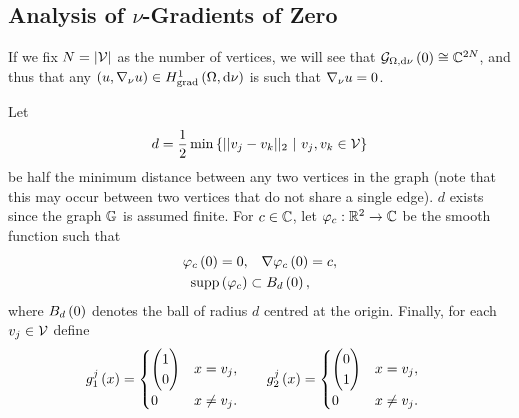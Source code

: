 \subsection{Analysis of $\nu$-Gradients of Zero} \label{appS:VertexGradZero}
If we fix $N = \left\lvert \mathcal{V} \right\rvert$ as the number of vertices, we will see that $\mathcal{G}_{ \Omega, \mathrm{d}\nu}\left( 0 \right) \cong \mathbb{C}^{2N}$, and thus that any $\left( u,\nabla_{\nu}u \right)\in H^1_\mathrm{grad}\left( \Omega, \mathrm{d}\nu \right)$ is such that $\nabla_{\nu}u=0$.
\begin{definition} \label{def:UsefulObjects}
	Let 
	\begin{align*}
		d=\recip{2}\min\clbracs{\norm{v_j-v_k}_2 \ \vert \ v_j,v_k\in\vertSet}
	\end{align*}
	be half the minimum distance between any two vertices in the graph (note that this may occur between two vertices that do not share a single edge).
	$d$ exists since the graph $\mathbb{G}$ is assumed finite.
	For $c\in\mathbb{C}$, let $\varphi_c:\mathbb{R}^2\rightarrow\mathbb{C}$ be the smooth function such that
	\begin{align*}
		\varphi_c\left( 0 \right) = 0, &\quad \nabla\varphi_c\left( 0 \right) = c, \\
		\mathrm{supp}\left( \varphi_c \right) &\subset B_{d}\left( 0 \right),
	\end{align*}
	where $B_{d}\left( 0 \right)$ denotes the ball of radius $d$ centred at the origin.
	Finally, for each $v_j\in\mathcal{V}$ define
	\begin{align*}
		g^j_1\left( x \right) &=
		\begin{cases}
			\begin{pmatrix} 1 \\ 0 \end{pmatrix} & x=v_j, \\
			0 & x\neq v_j. \\
		\end{cases}
		&\quad
		g^j_2\left( x \right) &=
		\begin{cases}
			\begin{pmatrix} 0 \\ 1 \end{pmatrix} & x=v_j, \\
			0 & x\neq v_j. \\
		\end{cases}
	\end{align*}
\end{definition}

